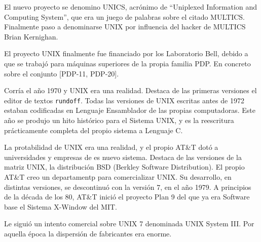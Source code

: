 El nuevo proyecto se denomino UNICS, acrónimo de ``Uniplexed Information and
Computing
System'', que era
un juego de palabras sobre el citado MULTICS. Finalmente paso
a denominarse UNIX por influencia del hacker de MULTICS Brian
Kernighan\endnote{}. 

El proyecto UNIX finalmente fue financiado por los Laboratorio Bell, debido a
que se trabajó para máquinas superiores de la
propia familia PDP. En concreto sobre el conjunto [PDP-11, PDP-20].


Corría el año 1970 y UNIX era una realidad. Destaca de las primeras versiones el
editor de textos 
\texttt{rundoff}. Todas las versiones de UNIX escritas antes
de 1972 estaban codificadas en Lenguaje Ensamblador de las propias computadoras.
Este año se produjo un hito histórico para el Sistema UNIX, y es la reescritura
prácticamente completa del propio sistema a Lenguaje C.


La protabilidad de UNIX era una realidad, y el propio AT\&T dotó a universidades
y empresas de es nuevo sistema. Destaca de las versiones de la matriz UNIX, la
distribución BSD (Berkley Software Distribution). El propio AT\&T creo un
departamentp para comercializar UNIX. Su desarrollo, en distintas versiones, se
descontinuó con la versión 7, en el año 1979. A principios de la década de los
80, AT\&T inició el proyecto Plan 9 del que ya era Software base el Sistema
X-Window del MIT. 


Le siguió un intento comercial sobre UNIX 7 denominada UNIX System III. Por
aquella época la dispersión de fabricantes era enorme. 


